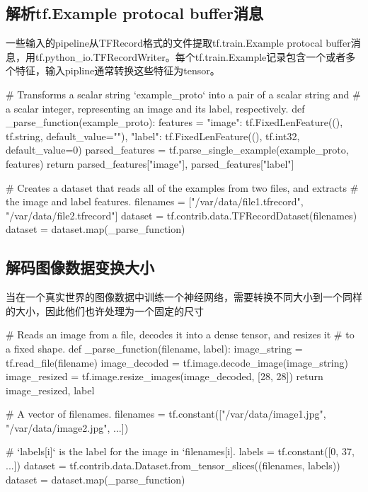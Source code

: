 \subsection{解析tf.Example protocal buffer消息}
一些输入的pipeline从TFRecord格式的文件提取tf.train.Example protocal buffer消息，用tf.python\_io.TFRecordWriter。每个tf.train.Example记录包含一个或者多个特征，输入pipline通常转换这些特征为tensor。
\begin{python}
# Transforms a scalar string `example\_proto` into a pair of a scalar string and
# a scalar integer, representing an image and its label, respectively.
def _parse_function(example_proto):
    features = {"image": tf.FixedLenFeature((), tf.string, default_value=""),
                "label": tf.FixedLenFeature((), tf.int32, default_value=0)}
    parsed_features = tf.parse_single_example(example_proto, features)
    return parsed_features["image"], parsed_features["label"]

# Creates a dataset that reads all of the examples from two files, and extracts
# the image and label features.
filenames = ["/var/data/file1.tfrecord", "/var/data/file2.tfrecord"]
dataset = tf.contrib.data.TFRecordDataset(filenames)
dataset = dataset.map(_parse_function)
\end{python}
\subsection{解码图像数据变换大小}
当在一个真实世界的图像数据中训练一个神经网络，需要转换不同大小到一个同样的大小，因此他们也许处理为一个固定的尺寸
\begin{python}
# Reads an image from a file, decodes it into a dense tensor, and resizes it
# to a fixed shape.
def _parse_function(filename, label):
    image_string = tf.read_file(filename)
    image_decoded = tf.image.decode_image(image_string)
    image_resized = tf.image.resize_images(image_decoded, [28, 28])
    return image_resized, label

# A vector of filenames.
filenames = tf.constant(["/var/data/image1.jpg", "/var/data/image2.jpg", ...])

# `labels[i]` is the label for the image in `filenames[i].
labels = tf.constant([0, 37, ...])
dataset = tf.contrib.data.Dataset.from\_tensor\_slices((filenames, labels))
dataset = dataset.map(\_parse\_function)
\end{python}
